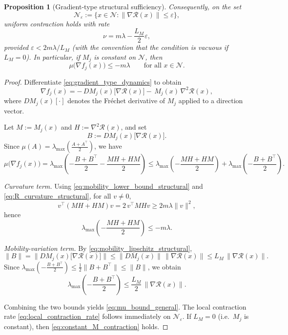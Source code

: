 \documentclass[12pt]{article}
\theoremstyle{plain}
\newtheorem{proposition}[theorem]{Proposition}
\theoremstyle{definition}
\theoremstyle{remark}
\begin{document}
\begin{proposition}[Gradient-type structural sufficiency]
Consequently, on the set
\begin{equation}
\mathcal N_\varepsilon
:=
\{x\in\mathcal N:\|\nabla\mathcal R(x)\|\le\varepsilon\},
\label{eq:N_epsilon}
\end{equation}
uniform contraction holds with rate
\begin{equation}
\nu
=
m\lambda
-
\frac{L_M}{2}\varepsilon,
\label{eq:local_contraction_rate}
\end{equation}
provided $\varepsilon<2m\lambda/L_M$ (with the convention that the
condition is vacuous if $L_M=0$). In particular, if $M_j$ is constant on
$\mathcal N$, then
\begin{equation}
\mu\!\big(\nabla f_j(x)\big)\le -m\lambda
\qquad \text{for all } x\in\mathcal N.
\label{eq:constant_M_contraction}
\end{equation}
\end{proposition}

\begin{proof}
Differentiate \eqref{eq:gradient_type_dynamics} to obtain
\begin{equation}
\nabla f_j(x)
=
-\,D M_j(x)\big[\nabla\mathcal R(x)\big]
-\,
M_j(x)\,\nabla^2\mathcal R(x),
\label{eq:jacobian_gradient_type}
\end{equation}
where $D M_j(x)[\cdot]$ denotes the Fr\'echet derivative of $M_j$ applied
to a direction vector.

Let $M:=M_j(x)$ and $H:=\nabla^2\mathcal R(x)$, and set
\[
B:=D M_j(x)\big[\nabla\mathcal R(x)\big].
\]
Since $\mu(A)=\lambda_{\max}\!\left(\frac{A+A^\top}{2}\right)$, we have
\[
\mu\!\big(\nabla f_j(x)\big)
=
\lambda_{\max}\!\left(
-\frac{B+B^\top}{2}
-\frac{MH+HM}{2}
\right)
\le
\lambda_{\max}\!\left(-\frac{MH+HM}{2}\right)
+
\lambda_{\max}\!\left(-\frac{B+B^\top}{2}\right).
\]

\emph{Curvature term.}
Using \eqref{eq:mobility_lower_bound_structural} and
\eqref{eq:R_curvature_structural}, for all $v\neq 0$,
\[
v^\top(MH+HM)v
=
2\,v^\top MHv
\ge
2m\lambda \|v\|^2,
\]
hence
\[
\lambda_{\max}\!\left(-\frac{MH+HM}{2}\right)\le -m\lambda.
\]

\emph{Mobility-variation term.}
By \eqref{eq:mobility_lipschitz_structural},
\[
\|B\|
=
\big\|D M_j(x)\big[\nabla\mathcal R(x)\big]\big\|
\le
\|D M_j(x)\|\,\|\nabla\mathcal R(x)\|
\le
L_M\,\|\nabla\mathcal R(x)\|.
\]
Since $\lambda_{\max}\!\left(-\frac{B+B^\top}{2}\right)\le \frac12\|B+B^\top\|
\le \|B\|$, we obtain
\[
\lambda_{\max}\!\left(-\frac{B+B^\top}{2}\right)
\le
\frac{L_M}{2}\,\|\nabla\mathcal R(x)\|.
\]

Combining the two bounds yields \eqref{eq:mu_bound_general}.
The local contraction rate \eqref{eq:local_contraction_rate} follows
immediately on $\mathcal N_\varepsilon$. If $L_M=0$ (i.e.\ $M_j$ is
constant), then \eqref{eq:constant_M_contraction} holds.
\end{proof}
\end{document}
